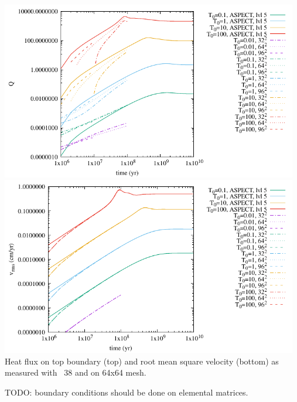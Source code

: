 \newpage
\begin{center}
\includegraphics[width=13cm]{python_codes/fieldstone_38/results/Q.pdf}\\
\includegraphics[width=13cm]{python_codes/fieldstone_38/results/vrms.pdf}\\
{\captionfont Heat flux on top boundary (top) and root mean square velocity (bottom)
as measured with \stone~38 and \aspect on 64x64 mesh.}
\end{center}

TODO: boundary conditions should be done on elemental matrices.




